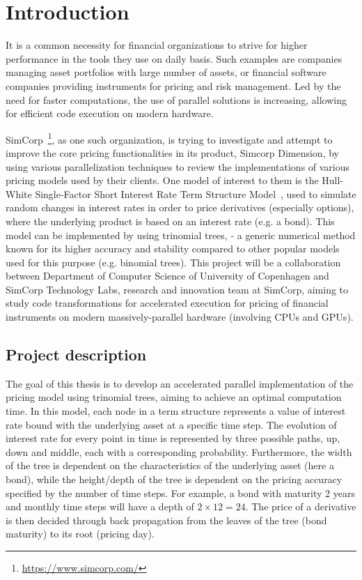 \chapter{Introduction}
\label{Introduction}
It is a common necessity for financial organizations to strive for higher performance in the tools they use on daily basis. Such examples are companies managing asset portfolios with large number of assets, or financial software companies providing instruments for pricing and risk management. Led by the need for faster computations, the use of parallel solutions is increasing, allowing for efficient code execution on modern hardware.

SimCorp~\footnote{\url{https://www.simcorp.com/}}, as one such organization, is trying to investigate and attempt to improve the core pricing functionalities in its product, Simcorp Dimension, by using various parallelization techniques to review the implementations of various pricing models used by their clients. One model of interest to them is the Hull-White Single-Factor Short Interest Rate Term Structure Model~\cite[pg. 691]{npfits, ofod}, used to simulate random changes in interest rates in order to price derivatives (especially options), where the underlying product is based on an interest rate (e.g. a bond). This model can be implemented by using trinomial trees\cite[pg. 444]{ofod}, \cite{uhwirt} - a generic numerical method known for its higher accuracy and stability compared to other popular models used for this purpose (e.g. binomial trees). This project will be a collaboration between Department of Computer Science of University of Copenhagen and SimCorp Technology Labs, research and innovation team at SimCorp, aiming to study code transformations for accelerated execution for pricing of financial instruments on modern massively-parallel hardware (involving CPUs and GPUs). 

\section{Project description}
The goal of this thesis is to develop an accelerated parallel implementation of the pricing model using trinomial trees, aiming to achieve an optimal computation time. In this model, each node in a term structure represents a value of interest rate bound with the underlying asset at a specific time step. The evolution of interest rate for every point in time is represented by three possible paths, up, down and middle, each with a corresponding probability. Furthermore, the width of the tree is dependent on the characteristics of the underlying asset (here a bond), while the height/depth of the tree is dependent on the pricing accuracy specified by the number of time steps. For example, a bond with maturity 2 years and monthly time steps will have a depth of $2 \times 12 = 24$. The price of a derivative is then decided through back propagation from the leaves of the tree (bond maturity) to its root (pricing day).

